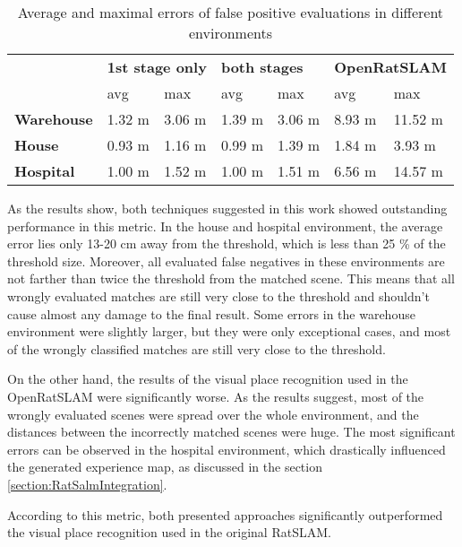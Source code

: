 \begin{table}[htpb]
    \caption{Average and maximal errors of false positive evaluations in different environments}\label{tab:averageFPError}
    \centering
    \begin{tabular}{l | l  l| l l| l l}
        \toprule
        \textbf{}          & \multicolumn{2}{l|}{\textbf{1st stage only}} & \multicolumn{2}{l|}{\textbf{both stages}} & \multicolumn{2}{l}{\textbf{OpenRatSLAM}}                             \\
        {}                 & avg                                          & max                                       & avg                                      & max    & avg    & max     \\
        \hline
        \textbf{Warehouse} & 1.32 m                                       & 3.06 m                                    & 1.39 m                                   & 3.06 m & 8.93 m & 11.52 m \\
        \textbf{House}     & 0.93 m                                       & 1.16 m                                    & 0.99 m                                   & 1.39 m & 1.84 m & 3.93 m  \\
        \textbf{Hospital}  & 1.00 m                                       & 1.52 m                                    & 1.00 m                                   & 1.51 m & 6.56 m & 14.57 m \\
        \bottomrule
    \end{tabular}
\end{table}

As the results show, both techniques suggested in this work showed outstanding performance in this metric. In the house and hospital environment, the average error lies only 13-20 cm away from the threshold, which is less than 25 \% of the threshold size. Moreover, all evaluated false negatives in these environments are not farther than twice the threshold from the matched scene. This means that all wrongly evaluated matches are still very close to the threshold and shouldn't cause almost any damage to the final result. Some errors in the warehouse environment were slightly larger, but they were only exceptional cases, and most of the wrongly classified matches are still very close to the threshold.\par
On the other hand, the results of the visual place recognition used in the OpenRatSLAM were significantly worse. As the results suggest, most of the wrongly evaluated scenes were spread over the whole environment, and the distances between the incorrectly matched scenes were huge. The most significant errors can be observed in the hospital environment, which drastically influenced the generated experience map, as discussed in the section \ref{section:RatSalmIntegration}.\par
According to this metric, both presented approaches significantly outperformed the visual place recognition used in the original RatSLAM.
